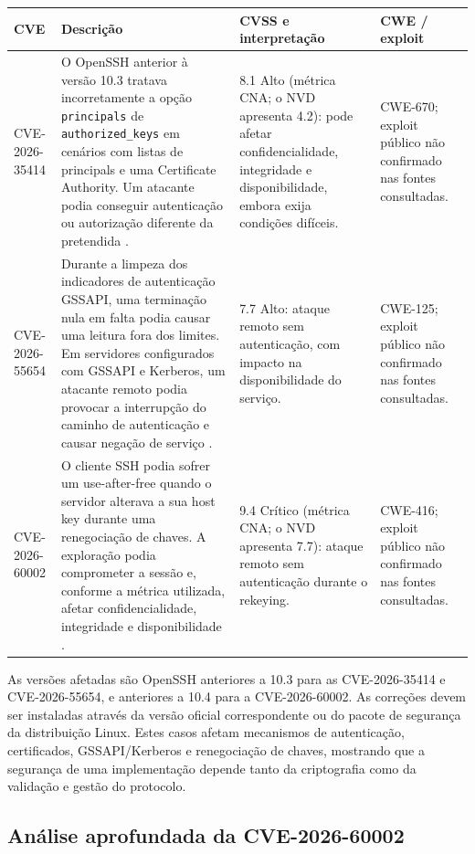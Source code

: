 \documentclass[11pt,a4paper]{article}
\begin{document}
\begin{center}
\small
\begin{tabularx}{\textwidth}{p{2.2cm}X p{2.1cm} p{2.1cm}}
\toprule
\textbf{CVE} & \textbf{Descrição} & \textbf{CVSS e interpretação} & \textbf{CWE / exploit} \\
\midrule
CVE-2026-35414 & O OpenSSH anterior à versão 10.3 tratava incorretamente a opção \texttt{principals} de \texttt{authorized\_keys} em cenários com listas de principals e uma Certificate Authority. Um atacante podia conseguir autenticação ou autorização diferente da pretendida \cite{cve35414}. & 8.1 Alto (métrica CNA; o NVD apresenta 4.2): pode afetar confidencialidade, integridade e disponibilidade, embora exija condições difíceis. & CWE-670; exploit público não confirmado nas fontes consultadas. \\
CVE-2026-55654 & Durante a limpeza dos indicadores de autenticação GSSAPI, uma terminação nula em falta podia causar uma leitura fora dos limites. Em servidores configurados com GSSAPI e Kerberos, um atacante remoto podia provocar a interrupção do caminho de autenticação e causar negação de serviço \cite{cve55654}. & 7.7 Alto: ataque remoto sem autenticação, com impacto na disponibilidade do serviço. & CWE-125; exploit público não confirmado nas fontes consultadas. \\
CVE-2026-60002 & O cliente SSH podia sofrer um use-after-free quando o servidor alterava a sua host key durante uma renegociação de chaves. A exploração podia comprometer a sessão e, conforme a métrica utilizada, afetar confidencialidade, integridade e disponibilidade \cite{cve60002}. & 9.4 Crítico (métrica CNA; o NVD apresenta 7.7): ataque remoto sem autenticação durante o rekeying. & CWE-416; exploit público não confirmado nas fontes consultadas. \\
\bottomrule
\end{tabularx}
\end{center}

As versões afetadas são OpenSSH anteriores a 10.3 para as CVE-2026-35414 e CVE-2026-55654, e anteriores a 10.4 para a CVE-2026-60002. As correções devem ser instaladas através da versão oficial correspondente ou do pacote de segurança da distribuição Linux. Estes casos afetam mecanismos de autenticação, certificados, GSSAPI/Kerberos e renegociação de chaves, mostrando que a segurança de uma implementação depende tanto da criptografia como da validação e gestão do protocolo.

\subsection*{Análise aprofundada da CVE-2026-60002}
\end{document}
